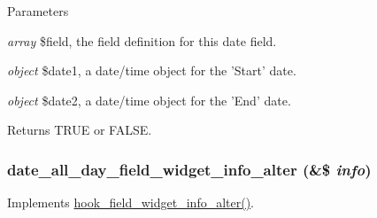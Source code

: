 \begin{DoxyParams}{Parameters}
\item[{\em array}]\$field, the field definition for this date field. \item[{\em object}]\$date1, a date/time object for the 'Start' date. \item[{\em object}]\$date2, a date/time object for the 'End' date. \end{DoxyParams}
\begin{DoxyReturn}{Returns}
TRUE or FALSE. 
\end{DoxyReturn}
\hypertarget{date__all__day_8module_a405d14e66b39059a5b8bd5e0ac7674af}{
\subsubsection[{date\_\-all\_\-day\_\-field\_\-widget\_\-info\_\-alter}]{\setlength{\rightskip}{0pt plus 5cm}date\_\-all\_\-day\_\-field\_\-widget\_\-info\_\-alter (\&\$ {\em info})}}
\label{date__all__day_8module_a405d14e66b39059a5b8bd5e0ac7674af}
Implements \hyperlink{group__field__widget_ga2e74ac1b4b45e9f31b58b86d01892e7e}{hook\_\-field\_\-widget\_\-info\_\-alter()}.

